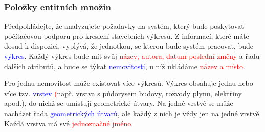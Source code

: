 \documentclass{beamer}
\begin{document}
{
{
\begin{frame}[plain]
\end{frame}
}
  \begin{frame}
    \frametitle{Položky entitních množin}
    \scriptsize{
    \hspace{0.5cm}Předpokládejte, že analyzujete požadavky na systém, který bude poskytovat počítačovou
    podporu pro kreslení stavebních výkresů. Z informací, které máte dosud k dispozici,
    vyplývá, že jednotkou, se kterou bude systém pracovat, bude \textcolor{blue}{výkres}. Každý výkres bude
    mít svůj \textcolor{red}{název, autora, datum poslední změny} a řadu dalších atributů, a bude se týkat
    \textcolor{blue}{nemovitosti}, u níž ukládáme \textcolor{red}{název a místo}.\par


    \hspace{0.5cm}Pro jednu nemovitost může existovat více výkresů. Výkres obsahuje jednu nebo více tzv.
    \textcolor{blue}{vrstev} \textcolor{red}({např. vrstva s půdorysem budovy, rozvody plynu, elektřiny apod.)}, do nichž se
    umísťují geometrické útvary. Na jedné vrstvě se může nacházet řada \textcolor{blue}{geometrických útvarů},
    ale každý z nich je vždy jen na jedné vrstvě. Každá vrstva má své \textcolor{red}{jednoznačné jméno}.\par


}
\end{frame}}
\end{document}
